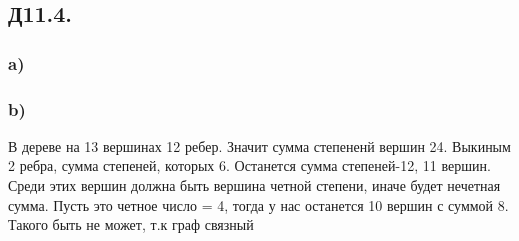 	\subsection*{Д11.4.}
	\subsubsection*{a)}


		\subsubsection*{b)}
		В дереве на 13 вершинах 12 ребер. Значит сумма степененй вершин 24. Выкиным 2 ребра, сумма степеней, которых 6. Останется сумма степеней-12, 11 вершин. Среди этих вершин должна быть вершина четной степени, иначе будет нечетная сумма. Пусть это четное число = 4, тогда у нас останется 10 вершин с суммой 8. Такого быть не может, т.к граф связный 

